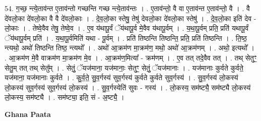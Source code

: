 \documentclass[17pt]{extarticle}
\begin{document}
54. ग॒च्छ॒ न्त्ये॒ताव॑न्त ए॒ताव॑न्तो गच्छन्ति गच्छ न्त्ये॒ताव॑न्तः । . ए॒ताव॑न्तो॒ वै वा ए॒ताव॑न्त ए॒ताव॑न्तो॒ वै । . वै दे॑वलो॒का दे॑वलो॒का वै वै दे॑वलो॒काः । . दे॒व॒लो॒का स्तेषु॒ तेषु॑ देवलो॒का दे॑वलो॒का स्तेषु॑ । . दे॒व॒लो॒का इति॑ देव - लो॒काः । . तेष्वे॒वैव तेषु॒ तेष्वे॒व । . ए॒व य॑थापू॒र्वं ॅय॑थापू॒र्व मे॒वैव य॑थापू॒र्वम् । . य॒था॒पू॒र्वम् प्रति॒ प्रति॑ यथापू॒र्वं ॅय॑थापू॒र्वम् प्रति॑ । . य॒था॒पू॒र्वमिति॑ यथा - पू॒र्वम् । . प्रति॑ तिष्ठन्ति तिष्ठन्ति॒ प्रति॒ प्रति॑ तिष्ठन्ति । . ति॒ष्ठ॒ न्त्यथो॒ अथो॑ तिष्ठन्ति तिष्ठ॒ न्त्यथो᳚ । . अथो॑ आ॒क्रम॑ण मा॒क्रम॑ण॒ मथो॒ अथो॑ आ॒क्रम॑णम् । . अथो॒ इत्यथो᳚ । . आ॒क्रम॑ण मे॒वै वाक्रम॑ण मा॒क्रम॑ण मे॒व । . आ॒क्रम॑ण॒मित्या᳚ - क्रम॑णम् । . ए॒व तत् तदे॒वैव तत् । . तथ् सेतुꣳ॒॒ सेतु॒म् तत् तथ् सेतु᳚म् । . सेतुं॒ ॅयज॑माना॒ यज॑मानाः॒ सेतुꣳ॒॒ सेतुं॒ ॅयज॑मानाः । . यज॑मानाः कुर्वते कुर्वते॒ यज॑माना॒ यज॑मानाः कुर्वते । . कु॒र्व॒ते॒ सु॒व॒र्गस्य॑ सुव॒र्गस्य॑ कुर्वते कुर्वते सुव॒र्गस्य॑ । . सु॒व॒र्गस्य॑ लो॒कस्य॑ लो॒कस्य॑ सुव॒र्गस्य॑ सुव॒र्गस्य॑ लो॒कस्य॑ । . सु॒व॒र्गस्येति॑ सुवः - गस्य॑ । . लो॒कस्य॒ सम॑ष्ट्यै॒ सम॑ष्ट्यै लो॒कस्य॑ लो॒कस्य॒ सम॑ष्ट्यै । . सम॑ष्ट्या॒ इति॒ सं - अ॒ष्ट्यै॒ । \newline

\textbf{Ghana Paata } \newline
\end{document}
